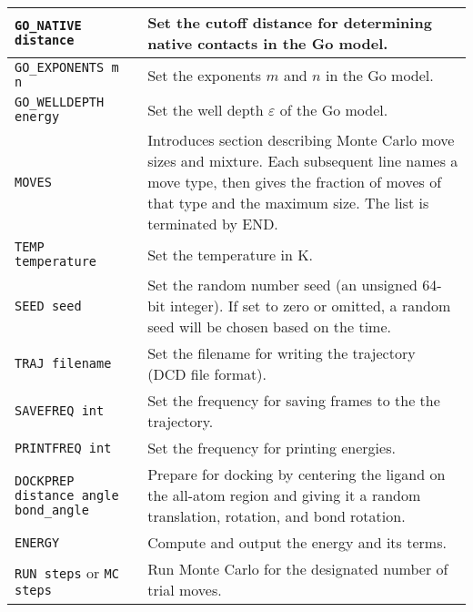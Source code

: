 \documentclass{article}      %
\begin{document}
\begin{longtable}{|l|p{3.25in}|}
\hline 
\verb+GO_NATIVE distance+ & Set the cutoff distance for determining native contacts in the Go model. \\
\hline
\verb+GO_EXPONENTS m n+ & Set the exponents $m$ and $n$ in the Go model. \\
\hline
\verb+GO_WELLDEPTH energy+ & Set the well depth $\varepsilon$ of the Go model. \\
\hline
\verb+MOVES+ & Introduces section describing Monte Carlo move sizes and mixture.  Each subsequent line names a move type, then gives the fraction of moves of that type and the maximum size.  The list is terminated by END. \\
\hline
\verb+TEMP temperature+& Set the temperature in K. \\
\hline
\verb+SEED seed+ & Set the random number seed (an unsigned 64-bit integer).  If set to zero or omitted, a random seed will be chosen based on the time. \\
\hline
\verb+TRAJ filename+ & Set the filename for writing the trajectory (DCD file format). \\
\hline
\verb+SAVEFREQ int+ & Set the frequency for saving frames to the the trajectory. \\
\hline
\verb+PRINTFREQ int+ & Set the frequency for printing energies. \\
\hline
\verb+DOCKPREP distance angle bond_angle+& Prepare for docking by centering the ligand on the all-atom region and giving it a random translation, rotation, and bond rotation. \\
\hline
\verb+ENERGY+ & Compute and output the energy and its terms. \\
\hline
\verb+RUN steps+ or \verb+MC steps+ & Run Monte Carlo for the designated number of trial moves. \\
\hline
\end{longtable}
\end{document}
